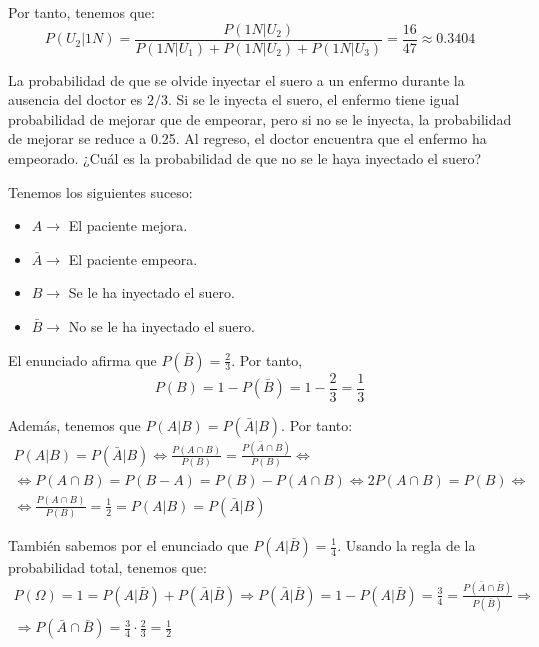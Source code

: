 \begin{ejercicio}
\begin{enumerate}
        Por tanto, tenemos que:
        \begin{equation*}
            P(U_2|1N) = \frac{P(1N|U_2)}{P(1N|U_1) + P(1N|U_2) + P(1N|U_3)} = \frac{16}{47}\approx 0.3404
        \end{equation*}
    \end{enumerate}
\end{ejercicio}

\begin{ejercicio} \label{ej:4.Ejercicio8}
    La probabilidad de que se olvide inyectar el suero a un enfermo durante la ausencia del doctor es $2/3$. Si se le inyecta el suero, el enfermo tiene igual probabilidad de mejorar que de empeorar, pero si no se le inyecta, la probabilidad de mejorar se reduce a 0.25. Al regreso, el doctor encuentra que el enfermo ha empeorado. ¿Cuál es la probabilidad de que no se le haya inyectado el suero?

    Tenemos los siguientes suceso:
    \begin{itemize}
        \item $A\longrightarrow $ El paciente mejora.
        \item $\bar{A}\longrightarrow $ El paciente empeora.
        \item $B\longrightarrow $ Se le ha inyectado el suero.
        \item $\bar{B}\longrightarrow $ No se le ha inyectado el suero.
    \end{itemize}

    El enunciado afirma que $P(\bar{B})=\frac{2}{3}$. Por tanto,
    \begin{equation*}
        P(B)=1-P(\bar{B}) = 1-\frac{2}{3} = \frac{1}{3}
    \end{equation*}

    Además, tenemos que $P(A|B) = P(\bar{A}|B)$. Por tanto:
    \begin{multline*}
        P(A|B) = P(\bar{A}|B) \Longleftrightarrow \frac{P(A\cap B)}{P(B)} = \frac{P(\bar{A}\cap B)}{P(B)} \Longleftrightarrow \\ \Longleftrightarrow
        P(A\cap B) = P(B-A) = P(B)-P(A\cap B) \Longleftrightarrow 2P(A\cap B)=P(B) 
        \Longleftrightarrow \\ \Longleftrightarrow
        \frac{P(A\cap B)}{P(B)} = \frac{1}{2} = P(A|B) = P(\bar{A}|B)
    \end{multline*}

    También sabemos por el enunciado que $P(A|\bar{B})=\frac{1}{4}$. Usando la regla de la probabilidad total, tenemos que:
    \begin{multline*}
        P(\Omega) = 1 = P(A|\bar{B}) + P(\bar{A}|\bar{B}) \Longrightarrow P(\bar{A}|\bar{B}) = 1-P(A|\bar{B}) = \frac{3}{4} = \frac{P(\bar{A} \cap \bar{B})}{P(\bar{B})}
        \Longrightarrow \\ \Longrightarrow
        P(\bar{A} \cap \bar{B}) = \frac{3}{4}\cdot \frac{2}{3} = \frac{1}{2}
    \end{multline*}
    

\end{ejercicio}
